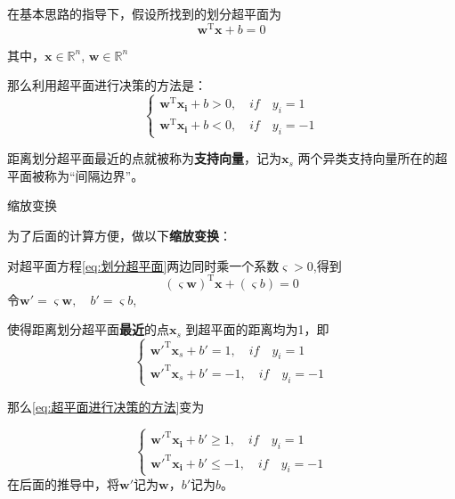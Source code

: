 \documentclass[withoutpreface,bwprint]{NoteBook}
\begin{document}
在基本思路的指导下，假设所找到的划分超平面为
\begin{equation}
    \label{eq:划分超平面}
    \mathbf{w}^\mathrm{T} \mathbf{x} + b = 0
\end{equation}

其中，$\mathbf{x} \in \mathbb{R}^n$, $\mathbf{w} \in \mathbb{R}^n$

那么利用超平面进行决策的方法是：
\begin{equation}
    \label{eq:超平面进行决策的方法}
    \begin{cases}
        \mathbf{w}^\mathrm{T} \mathbf{x_i} + b > 0, \quad if \quad y_i =1 \\
        \mathbf{w}^\mathrm{T} \mathbf{x_i} + b < 0, \quad if \quad y_i =-1
    \end{cases}
\end{equation}

距离划分超平面最近的点就被称为\textbf{支持向量}，记为$\mathbf{x}_s$
两个异类支持向量所在的超平面被称为“间隔边界”。

\begin{criticalSteps}
    {缩放变换}
    {}

为了后面的计算方便，做以下\textbf{缩放变换}：

对超平面方程\cref{eq:划分超平面}两边同时乘一个系数$\varsigma >0$,得到
\begin{equation}
    (\varsigma \mathbf{w})^\mathrm{T} \mathbf{x} + (\varsigma b)= 0
\end{equation}
令$\mathbf{w}' = \varsigma \mathbf{w}, \quad b' = \varsigma b$,

使得距离划分超平面\textbf{最近}的点$ \mathbf{x}_s $ 到超平面的距离均为1，即
\begin{equation}
    \label{eq:距离划分超平面最近的点到超平面的距离为1}
    \begin{cases}
        \mathbf{w'}^\mathrm{T} \mathbf{x}_s + b' = 1, \quad if \quad y_i =1 \\
        \mathbf{w'}^\mathrm{T} \mathbf{x}_s + b' = -1, \quad if \quad y_i =-1
    \end{cases}
\end{equation}

\end{criticalSteps}

那么\cref{eq:超平面进行决策的方法}变为

\begin{equation}
    \label{eq:超平面进行决策的方法2}
    \begin{cases}
        \mathbf{w'}^\mathrm{T} \mathbf{x_i} + b' \geq 1, \quad if \quad y_i =1 \\
        \mathbf{w'}^\mathrm{T} \mathbf{x_i} + b' \leq -1, \quad if \quad y_i =-1
    \end{cases}
\end{equation}
在后面的推导中，将$\mathbf{w'}$记为$\mathbf{w}$，$b'$记为$b$。
\end{document}
